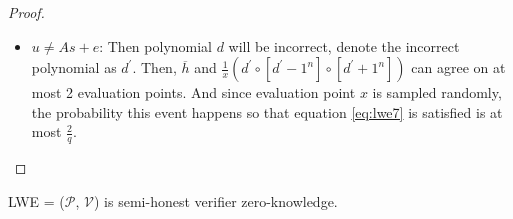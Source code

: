\begin{proof}
\begin{itemize}
    \item $u \neq As + e$: Then polynomial $d$ will be incorrect, denote the incorrect polynomial as $d^\prime$. Then, $\overline{h}$ and $\frac{1}{x} (d^\prime \circ [d^\prime - 1^n] \circ [d^\prime + 1^n])$ can agree on at most 2 evaluation points. And since evaluation point $x$ is sampled randomly, the probability this event happens so that equation \ref{eq:lwe7} is satisfied is at most $\frac{2}{q}$. 
    
\end{itemize}


\end{proof}

\begin{lemma}
\label{lemma:lwezk}

LWE = ($\mathcal{P}$, $\mathcal{V}$) is semi-honest verifier zero-knowledge.

\end{lemma}

